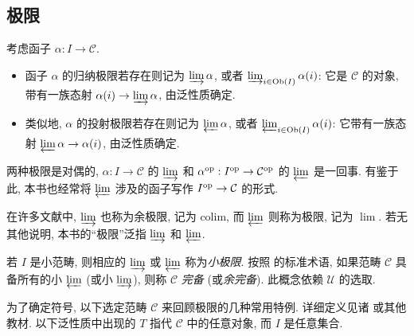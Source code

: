\subsection*{极限}
考虑函子 $\alpha: I \to \mathcal{C}$.
\begin{itemize}
	\item 函子 $\alpha$ 的归纳极限若存在则记为 $\varinjlim \alpha$, 或者 $\varinjlim_{i \in \operatorname{Ob}(I)} \alpha(i)$: 它是 $\mathcal{C}$ 的对象, 带有一族态射 $\alpha(i) \to \varinjlim \alpha$, 由泛性质确定.
	\item 类似地, $\alpha$ 的投射极限若存在则记为 $\varprojlim \alpha$, 或者 $\varprojlim_{i \in \operatorname{Ob}(I)} \alpha(i)$: 它带有一族态射 $\varprojlim \alpha \to \alpha(i)$, 由泛性质确定.
\end{itemize}
两种极限是对偶的, $\alpha: I \to \mathcal{C}$ 的 $\varinjlim$ 和 $\alpha^{\operatorname{op}}: I^{\operatorname{op}} \to \mathcal{C}^{\operatorname{op}}$ 的 $\varprojlim$ 是一回事. 有鉴于此, 本书也经常将 $\varprojlim$ 涉及的函子写作 $I^{\operatorname{op}} \to \mathcal{C}$ 的形式.

在许多文献中, $\varinjlim$ 也称为余极限, 记为 $\mathrm{colim}$, 而 $\varprojlim$ 则称为极限, 记为 $\lim$. 若无其他说明, 本书的``极限''泛指 $\varinjlim$ 和 $\varprojlim$.

若 $I$ 是小范畴, 则相应的 $\varinjlim$ 或 $\varprojlim$ 称为\emph{小极限}. 按照 \cite[\S 2.8]{Li1} 的标准术语, 如果范畴 $\mathcal{C}$ 具备所有的小 $\varprojlim$ (或小 $\varinjlim$), 则称 $\mathcal{C}$ \emph{完备} (或\emph{余完备}). 此概念依赖 $\mathcal{U}$ 的选取.

为了确定符号, 以下选定范畴 $\mathcal{C}$ 来回顾极限的几种常用特例. 详细定义见诸 \cite[\S 2.7]{Li1} 或其他教材. 以下泛性质中出现的 $T$ 指代 $\mathcal{C}$ 中的任意对象, 而 $I$ 是任意集合.

